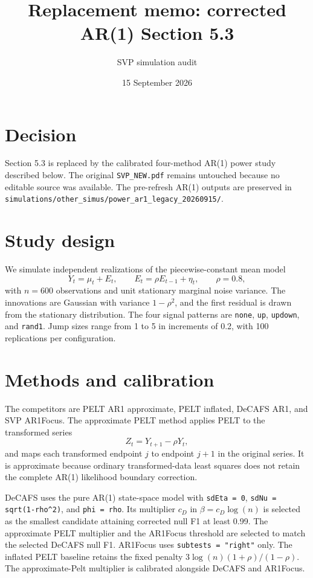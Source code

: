 \documentclass[11pt]{article}
\title{Replacement memo: corrected AR(1) Section 5.3}
\author{SVP simulation audit}
\date{15 September 2026}
\begin{document}
\maketitle

\section*{Decision}
Section 5.3 is replaced by the calibrated four-method AR(1) power study
described below. The original \texttt{SVP\_NEW.pdf} remains untouched because
no editable source was available. The pre-refresh AR(1) outputs are preserved
in \texttt{simulations/other\_simus/power\_ar1\_legacy\_20260915/}.

\section*{Study design}
We simulate independent realizations of the piecewise-constant mean model
\[
Y_t = \mu_t + E_t, \qquad E_t = \rho E_{t-1} + \eta_t,
\qquad \rho=0.8,
\]
with $n=600$ observations and unit stationary marginal noise variance. The
innovations are Gaussian with variance $1-\rho^2$, and the first residual is
drawn from the stationary distribution. The four signal patterns are
\texttt{none}, \texttt{up}, \texttt{updown}, and \texttt{rand1}. Jump sizes
range from 1 to 5 in increments of 0.2, with 100 replications per
configuration.

\section*{Methods and calibration}
The competitors are PELT AR1 approximate, PELT inflated, DeCAFS AR1, and SVP
AR1Focus. The approximate PELT method applies PELT to the transformed series
\[
Z_t=Y_{t+1}-\rho Y_t,
\]
and maps each transformed endpoint $j$ to endpoint $j+1$ in the original
series. It is approximate because ordinary transformed-data least squares does
not retain the complete AR(1) likelihood boundary correction.

DeCAFS uses the pure AR(1) state-space model with
\texttt{sdEta = 0}, \texttt{sdNu = sqrt(1-rho\string^2)}, and
\texttt{phi = rho}. Its multiplier $c_D$ in $\beta=c_D\log(n)$ is selected as
the smallest candidate attaining corrected null F1 at least 0.99. The
approximate PELT multiplier and the AR1Focus threshold are selected to match
the selected DeCAFS null F1. AR1Focus uses \texttt{subtests = "right"} only.
The inflated PELT baseline retains the fixed penalty
$3\log(n)(1+\rho)/(1-\rho)$. The approximate-Pelt multiplier is calibrated
alongside DeCAFS and AR1Focus.
\end{document}
